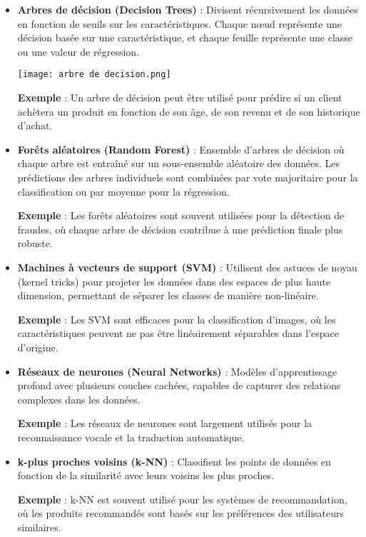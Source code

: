 \documentclass[10pt,a4paper]{article}
\begin{document}
\begin{itemize}
    \item \textbf{Arbres de décision (Decision Trees)} : Divisent récursivement les données en fonction de seuils sur les caractéristiques. Chaque nœud représente une décision basée sur une caractéristique, et chaque feuille représente une classe ou une valeur de régression.

\texttt{[image: arbre de decision.png]}

    \textbf{Exemple} : Un arbre de décision peut être utilisé pour prédire si un client achètera un produit en fonction de son âge, de son revenu et de son historique d'achat.

    \item \textbf{Forêts aléatoires (Random Forest)} : Ensemble d'arbres de décision où chaque arbre est entraîné sur un sous-ensemble aléatoire des données. Les prédictions des arbres individuels sont combinées par vote majoritaire pour la classification ou par moyenne pour la régression.

    \textbf{Exemple} : Les forêts aléatoires sont souvent utilisées pour la détection de fraudes, où chaque arbre de décision contribue à une prédiction finale plus robuste.

    \item \textbf{Machines à vecteurs de support (SVM)} : Utilisent des astuces de noyau (kernel tricks) pour projeter les données dans des espaces de plus haute dimension, permettant de séparer les classes de manière non-linéaire.

    \textbf{Exemple} : Les SVM sont efficaces pour la classification d'images, où les caractéristiques peuvent ne pas être linéairement séparables dans l'espace d'origine.

    \item \textbf{Réseaux de neurones (Neural Networks)} : Modèles d'apprentissage profond avec plusieurs couches cachées, capables de capturer des relations complexes dans les données.

    \textbf{Exemple} : Les réseaux de neurones sont largement utilisés pour la reconnaissance vocale et la traduction automatique.

    \item \textbf{k-plus proches voisins (k-NN)} : Classifient les points de données en fonction de la similarité avec leurs voisins les plus proches.

    \textbf{Exemple} : k-NN est souvent utilisé pour les systèmes de recommandation, où les produits recommandés sont basés sur les préférences des utilisateurs similaires.
\end{itemize}
\end{document}
